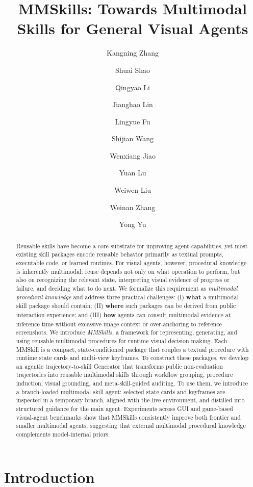 \documentclass{llmxive}
\title{MMSkills: Towards Multimodal Skills for General Visual Agents}
\author{Kangning Zhang \and Shuai Shao \and Qingyao Li \and Jianghao Lin \and Lingyue Fu \and Shijian Wang \and Wenxiang Jiao \and Yuan Lu \and Weiwen Liu \and Weinan Zhang \and Yong Yu}
\begin{document}
\maketitle
\begin{abstract}
Reusable skills have become a core substrate for improving agent capabilities, yet most existing skill packages encode reusable behavior primarily as textual prompts, executable code, or learned routines. For visual agents, however, procedural knowledge is inherently multimodal: reuse depends not only on what operation to perform, but also on recognizing the relevant state, interpreting visual evidence of progress or failure, and deciding what to do next. We formalize this requirement as \emph{multimodal procedural knowledge} and address three practical challenges: (I) \textbf{what} a multimodal skill package should contain; (II) \textbf{where} such packages can be derived from public interaction experience; and (III) \textbf{how} agents can consult multimodal evidence at inference time without excessive image context or over-anchoring to reference screenshots. We introduce \emph{MMSkills}, a framework for representing, generating, and using reusable multimodal procedures for runtime visual decision making. Each MMSkill is a compact, state-conditioned package that couples a textual procedure with runtime state cards and multi-view keyframes. To construct these packages, we develop an agentic trajectory-to-skill Generator that transforms public non-evaluation trajectories into reusable multimodal skills through workflow grouping, procedure induction, visual grounding, and meta-skill-guided auditing. To use them, we introduce a branch-loaded multimodal skill agent: selected state cards and keyframes are inspected in a temporary branch, aligned with the live environment, and distilled into structured guidance for the main agent. Experiments across GUI and game-based visual-agent benchmarks show that MMSkills consistently improve both frontier and smaller multimodal agents, suggesting that external multimodal procedural knowledge complements model-internal priors.
\end{abstract}

\section{Introduction}
\label{sec:introduction}
\end{document}
